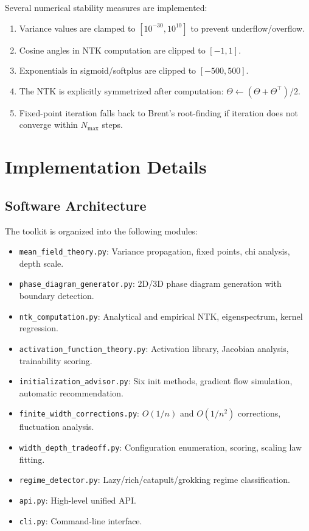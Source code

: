 \documentclass[10pt]{article}
\theoremstyle{definition}
\begin{document}
Several numerical stability measures are implemented:
\begin{enumerate}[nosep]
  \item Variance values are clamped to $[10^{-30}, 10^{10}]$ to prevent underflow/overflow.
  \item Cosine angles in NTK computation are clipped to $[-1, 1]$.
  \item Exponentials in sigmoid/softplus are clipped to $[-500, 500]$.
  \item The NTK is explicitly symmetrized after computation: $\Theta \leftarrow (\Theta + \Theta^\top)/2$.
  \item Fixed-point iteration falls back to Brent's root-finding if iteration does not converge within $N_{\max}$ steps.
\end{enumerate}

\section{Implementation Details}
\label{app:implementation}

\subsection{Software Architecture}

The toolkit is organized into the following modules:
\begin{itemize}[nosep]
  \item \texttt{mean\_field\_theory.py}: Variance propagation, fixed points, chi analysis, depth scale.
  \item \texttt{phase\_diagram\_generator.py}: 2D/3D phase diagram generation with boundary detection.
  \item \texttt{ntk\_computation.py}: Analytical and empirical NTK, eigenspectrum, kernel regression.
  \item \texttt{activation\_function\_theory.py}: Activation library, Jacobian analysis, trainability scoring.
  \item \texttt{initialization\_advisor.py}: Six init methods, gradient flow simulation, automatic recommendation.
  \item \texttt{finite\_width\_corrections.py}: $O(1/n)$ and $O(1/n^2)$ corrections, fluctuation analysis.
  \item \texttt{width\_depth\_tradeoff.py}: Configuration enumeration, scoring, scaling law fitting.
  \item \texttt{regime\_detector.py}: Lazy/rich/catapult/grokking regime classification.
  \item \texttt{api.py}: High-level unified API.
  \item \texttt{cli.py}: Command-line interface.
\end{itemize}
\end{document}
